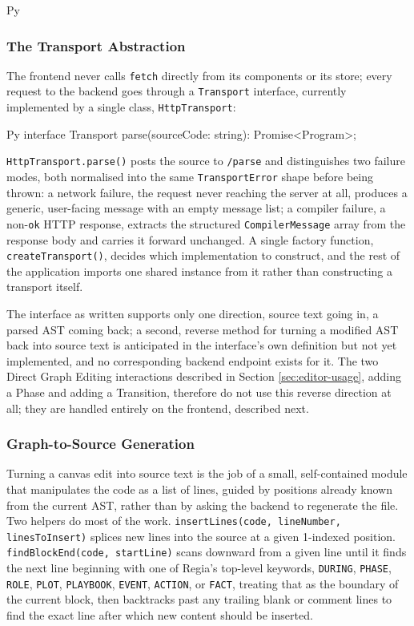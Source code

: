 \begin{codeblock}[]{Py}
\subsubsection{The Transport Abstraction}
The frontend never calls \lstinline|fetch| directly from its components or its store; every request to the backend goes through a \lstinline|Transport| interface, currently implemented by a single class, \lstinline|HttpTransport|:
\begin{codeblock}[]{Py}
interface Transport {
    parse(sourceCode: string): Promise<Program>;
}
\end{codeblock}
\lstinline|HttpTransport.parse()| posts the source to \lstinline|/parse| and distinguishes two failure modes, both normalised into the same \lstinline|TransportError| shape before being thrown: a network failure, the request never reaching the server at all, produces a generic, user-facing message with an empty message list; a compiler failure, a non-\lstinline|ok| HTTP response, extracts the structured \lstinline|CompilerMessage| array from the response body and carries it forward unchanged. A single factory function, \lstinline|createTransport()|, decides which implementation to construct, and the rest of the application imports one shared instance from it rather than constructing a transport itself.

The interface as written supports only one direction, source text going in, a parsed AST coming back; a second, reverse method for turning a modified AST back into source text is anticipated in the interface's own definition but not yet implemented, and no corresponding backend endpoint exists for it. The two Direct Graph Editing interactions described in Section \ref{sec:editor-usage}, adding a Phase and adding a Transition, therefore do not use this reverse direction at all; they are handled entirely on the frontend, described next.

\subsubsection{Graph-to-Source Generation}
Turning a canvas edit into source text is the job of a small, self-contained module that manipulates the code as a list of lines, guided by positions already known from the current AST, rather than by asking the backend to regenerate the file. Two helpers do most of the work. \lstinline|insertLines(code, lineNumber, linesToInsert)| splices new lines into the source at a given 1-indexed position. \lstinline|findBlockEnd(code, startLine)| scans downward from a given line until it finds the next line beginning with one of Regia's top-level keywords, \lstinline|DURING|, \lstinline|PHASE|, \lstinline|ROLE|, \lstinline|PLOT|, \lstinline|PLAYBOOK|, \lstinline|EVENT|, \lstinline|ACTION|, or \lstinline|FACT|, treating that as the boundary of the current block, then backtracks past any trailing blank or comment lines to find the exact line after which new content should be inserted.


\end{codeblock}
